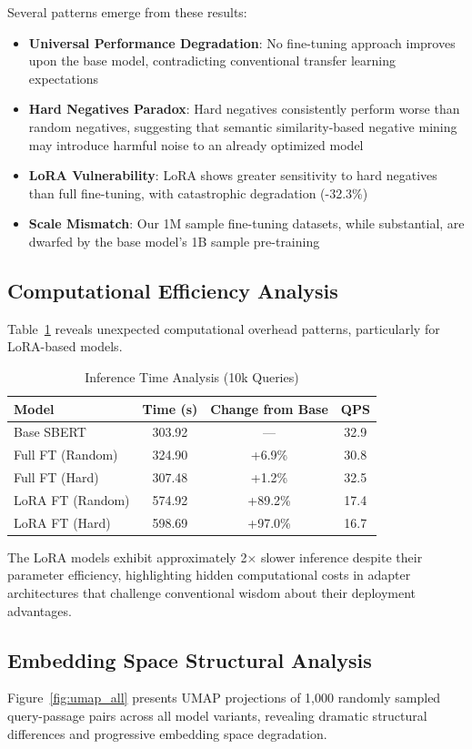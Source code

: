 \documentclass[conference]{IEEEtran}
\begin{document}
Several patterns emerge from these results:
\begin{itemize}
\item \textbf{Universal Performance Degradation}: No fine-tuning approach improves upon the base model, contradicting conventional transfer learning expectations
\item \textbf{Hard Negatives Paradox}: Hard negatives consistently perform worse than random negatives, suggesting that semantic similarity-based negative mining may introduce harmful noise to an already optimized model
\item \textbf{LoRA Vulnerability}: LoRA shows greater sensitivity to hard negatives than full fine-tuning, with catastrophic degradation (-32.3\%)
\item \textbf{Scale Mismatch}: Our 1M sample fine-tuning datasets, while substantial, are dwarfed by the base model's 1B sample pre-training
\end{itemize}

\subsection{Computational Efficiency Analysis}
Table~\ref{tab:inference_detailed} reveals unexpected computational overhead patterns, particularly for LoRA-based models.

\begin{table}[h]
\centering
\caption{Inference Time Analysis (10k Queries)}
\label{tab:inference_detailed}
\begin{tabular}{lccc}
\toprule
Model & Time (s) & Change from Base & QPS \\
\midrule
Base SBERT & 303.92 & — & 32.9 \\
Full FT (Random) & 324.90 & +6.9\% & 30.8 \\
Full FT (Hard) & 307.48 & +1.2\% & 32.5 \\
LoRA FT (Random) & 574.92 & +89.2\% & 17.4 \\
LoRA FT (Hard) & 598.69 & +97.0\% & 16.7 \\
\bottomrule
\end{tabular}
\end{table}

The LoRA models exhibit approximately 2× slower inference despite their parameter efficiency, highlighting hidden computational costs in adapter architectures that challenge conventional wisdom about their deployment advantages.

\subsection{Embedding Space Structural Analysis}
Figure~\ref{fig:umap_all} presents UMAP \cite{mcinnes2018umap} projections of 1,000 randomly sampled query-passage pairs across all model variants, revealing dramatic structural differences and progressive embedding space degradation.
\end{document}
